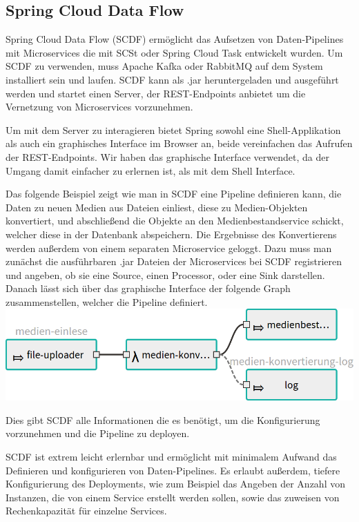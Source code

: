 \documentclass{article}
\begin{document}
\subsection{Spring Cloud Data Flow}

Spring Cloud Data Flow (SCDF) ermöglicht das Aufsetzen von Daten-Pipelines mit Microservices die mit SCSt oder Spring Cloud Task entwickelt wurden.
Um SCDF zu verwenden, muss Apache Kafka oder RabbitMQ auf dem System installiert sein und laufen.
SCDF kann als .jar heruntergeladen und ausgeführt werden und startet einen Server, der REST-Endpoints anbietet um die Vernetzung von Microservices vorzunehmen.

Um mit dem Server zu interagieren bietet Spring sowohl eine Shell-Applikation als auch ein graphisches Interface im Browser an, beide vereinfachen das Aufrufen der REST-Endpoints.
Wir haben das graphische Interface verwendet, da der Umgang damit einfacher zu erlernen ist, als mit dem Shell Interface.

Das folgende Beispiel zeigt wie man in SCDF eine Pipeline definieren kann, die Daten zu neuen Medien aus Dateien einliest, diese zu Medien-Objekten konvertiert, und abschließend die Objekte an den Medienbestandservice schickt, welcher diese in der Datenbank abspeichern.
Die Ergebnisse des Konvertierens werden außerdem von einem separaten Microservice geloggt.
Dazu muss man zunächst die ausführbaren .jar Dateien der Microservices bei SCDF registrieren und angeben, ob sie eine Source, einen Processor, oder eine Sink darstellen.
Danach lässt sich über das graphische Interface der folgende Graph zusammenstellen, welcher die Pipeline definiert.\medskip\\
\includegraphics[width=\textwidth]{stream-small.png}

Dies gibt SCDF alle Informationen die es benötigt, um die Konfigurierung vorzunehmen und die Pipeline zu deployen.

SCDF ist extrem leicht erlernbar und ermöglicht mit minimalem Aufwand das Definieren und konfigurieren von Daten-Pipelines.
Es erlaubt außerdem, tiefere Konfigurierung des Deployments, wie zum Beispiel das Angeben der Anzahl von Instanzen, die von einem Service erstellt werden sollen, sowie das zuweisen von Rechenkapazität für einzelne Services.
\end{document}
